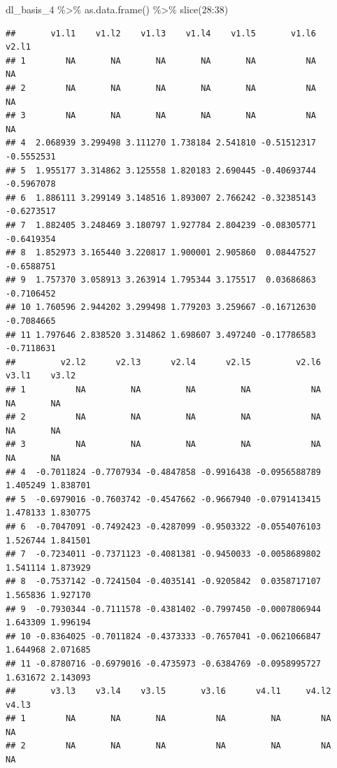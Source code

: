 \documentclass[
]{book}
\newenvironment{Shaded}{\begin{snugshade}}{\end{snugshade}}
\newcommand{\DecValTok}[1]{\textcolor[rgb]{0.00,0.00,0.81}{#1}}
\newcommand{\FunctionTok}[1]{\textcolor[rgb]{0.00,0.00,0.00}{#1}}
\newcommand{\NormalTok}[1]{#1}
\newcommand{\SpecialCharTok}[1]{\textcolor[rgb]{0.00,0.00,0.00}{#1}}
\begin{document}
\begin{Shaded}
\begin{Highlighting}[]
\NormalTok{dl\_basis\_4 }\SpecialCharTok{\%\textgreater{}\%} 
  \FunctionTok{as.data.frame}\NormalTok{() }\SpecialCharTok{\%\textgreater{}\%} 
  \FunctionTok{slice}\NormalTok{(}\DecValTok{28}\SpecialCharTok{:}\DecValTok{38}\NormalTok{)}
\end{Highlighting}
\end{Shaded}

\begin{verbatim}
##       v1.l1    v1.l2    v1.l3    v1.l4    v1.l5       v1.l6      v2.l1
## 1        NA       NA       NA       NA       NA          NA         NA
## 2        NA       NA       NA       NA       NA          NA         NA
## 3        NA       NA       NA       NA       NA          NA         NA
## 4  2.068939 3.299498 3.111270 1.738184 2.541810 -0.51512317 -0.5552531
## 5  1.955177 3.314862 3.125558 1.820183 2.690445 -0.40693744 -0.5967078
## 6  1.886111 3.299149 3.148516 1.893007 2.766242 -0.32385143 -0.6273517
## 7  1.882405 3.248469 3.180797 1.927784 2.804239 -0.08305771 -0.6419354
## 8  1.852973 3.165440 3.220817 1.900001 2.905860  0.08447527 -0.6588751
## 9  1.757370 3.058913 3.263914 1.795344 3.175517  0.03686863 -0.7106452
## 10 1.760596 2.944202 3.299498 1.779203 3.259667 -0.16712630 -0.7084665
## 11 1.797646 2.838520 3.314862 1.698607 3.497240 -0.17786583 -0.7118631
##         v2.l2      v2.l3      v2.l4      v2.l5         v2.l6    v3.l1    v3.l2
## 1          NA         NA         NA         NA            NA       NA       NA
## 2          NA         NA         NA         NA            NA       NA       NA
## 3          NA         NA         NA         NA            NA       NA       NA
## 4  -0.7011824 -0.7707934 -0.4847858 -0.9916438 -0.0956588789 1.405249 1.838701
## 5  -0.6979016 -0.7603742 -0.4547662 -0.9667940 -0.0791413415 1.478133 1.830775
## 6  -0.7047091 -0.7492423 -0.4287099 -0.9503322 -0.0554076103 1.526744 1.841501
## 7  -0.7234011 -0.7371123 -0.4081381 -0.9450033 -0.0058689802 1.541114 1.873929
## 8  -0.7537142 -0.7241504 -0.4035141 -0.9205842  0.0358717107 1.565836 1.927170
## 9  -0.7930344 -0.7111578 -0.4381402 -0.7997450 -0.0007806944 1.643309 1.996194
## 10 -0.8364025 -0.7011824 -0.4373333 -0.7657041 -0.0621066847 1.644968 2.071685
## 11 -0.8780716 -0.6979016 -0.4735973 -0.6384769 -0.0958995727 1.631672 2.143093
##       v3.l3    v3.l4    v3.l5       v3.l6      v4.l1     v4.l2     v4.l3
## 1        NA       NA       NA          NA         NA        NA        NA
## 2        NA       NA       NA          NA         NA        NA        NA

\end{verbatim}
\end{document}
